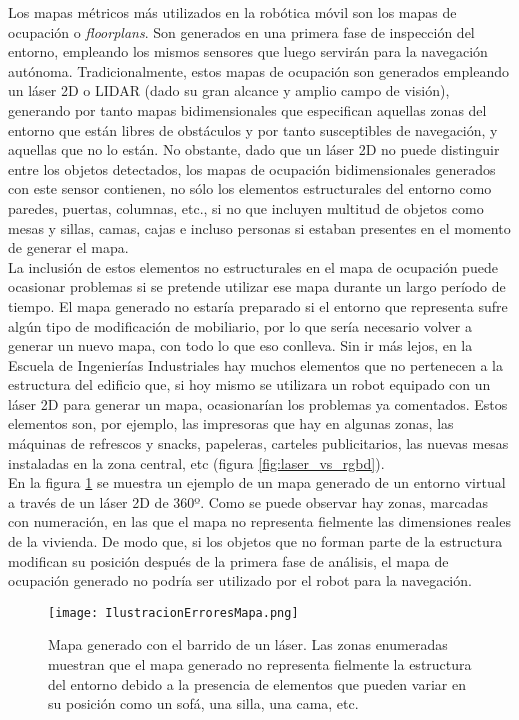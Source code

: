 Los mapas métricos más utilizados en la robótica móvil son los mapas de ocupación o \textit{floorplans}. Son generados en una primera fase de inspección del entorno, empleando los mismos sensores que luego servirán para la navegación autónoma. Tradicionalmente, estos mapas de ocupación son generados empleando un láser 2D o LIDAR (dado su gran alcance y amplio campo de visión), generando por tanto mapas bidimensionales que especifican aquellas zonas del entorno que están libres de obstáculos y por tanto susceptibles de navegación, y aquellas que no lo están. No obstante, dado que un láser 2D no puede distinguir entre los objetos detectados, los mapas de ocupación bidimensionales generados con este sensor contienen, no sólo los elementos estructurales del entorno como paredes, puertas, columnas, etc., si no que incluyen multitud de objetos como mesas y sillas, camas, cajas e incluso personas si estaban presentes en el momento de generar el mapa.\\

La inclusión de estos elementos no estructurales en el mapa de ocupación puede ocasionar problemas si se pretende utilizar ese mapa durante un largo período de tiempo. El mapa generado no estaría preparado si el entorno que representa sufre algún tipo de modificación de mobiliario, por lo que sería necesario volver a generar un nuevo mapa, con todo lo que eso conlleva. Sin ir más lejos, en la Escuela de Ingenierías Industriales hay muchos elementos que no pertenecen a la estructura del edificio que, si hoy mismo se utilizara un robot equipado con un láser 2D para generar un mapa, ocasionarían los problemas ya comentados. Estos elementos son, por ejemplo, las impresoras que hay en algunas zonas, las máquinas de refrescos y snacks, papeleras, carteles publicitarios, las nuevas mesas instaladas en la zona central, etc (figura \ref{fig:laser_vs_rgbd}).\\

En la figura \ref{fig:errores_laser} se muestra un ejemplo de un mapa generado de un entorno virtual a través de un láser 2D de 360º. Como se puede observar hay zonas, marcadas con numeración, en las que el mapa no representa fielmente las dimensiones reales de la vivienda. De modo que, si los objetos que no forman parte de la estructura modifican su posición después de la primera fase de análisis, el mapa de ocupación generado no podría ser utilizado por el robot para la navegación. \\

\begin{figure}[h]
	\begin{center} 
	\texttt{[image: IlustracionErroresMapa.png]}
	\end{center}
	\caption{Mapa generado con el barrido de un láser. Las zonas enumeradas muestran que el mapa generado no representa fielmente la estructura del entorno debido a la presencia de elementos que pueden variar en su posición como un sofá, una silla, una cama, etc.}
	\label{fig:errores_laser}
\end{figure}

